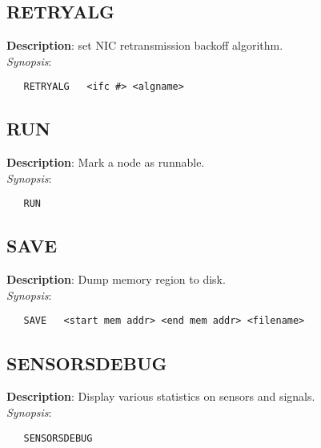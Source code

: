 \subsection{\bf RETRYALG}
\label{manpages:RETRYALG}
\label{manpages:retryalg}
\vspace{-0.2in}
{\bf Description}: 	set NIC retransmission backoff algorithm.\\[1.5ex]
{\em Synopsis}:
\vspace{-0.2in}
\scriptsize
\begin{verbatim}
   RETRYALG   <ifc #> <algname>		
\end{verbatim}
\normalsize
\vspace{-0.2in}


\subsection{\bf RUN}
\label{manpages:RUN}
\label{manpages:run}
\vspace{-0.2in}
{\bf Description}: 	Mark a node as runnable.\\[1.5ex]
{\em Synopsis}:
\vspace{-0.2in}
\scriptsize
\begin{verbatim}
   RUN    						
\end{verbatim}
\normalsize
\vspace{-0.2in}


\subsection{\bf SAVE}
\label{manpages:SAVE}
\label{manpages:save}
\vspace{-0.2in}
{\bf Description}: 	Dump memory region to disk.\\[1.5ex]
{\em Synopsis}:
\vspace{-0.2in}
\scriptsize
\begin{verbatim}
   SAVE   <start mem addr> <end mem addr> <filename>	
\end{verbatim}
\normalsize
\vspace{-0.2in}


\subsection{\bf SENSORSDEBUG}
\label{manpages:SENSORSDEBUG}
\label{manpages:sensorsdebug}
\vspace{-0.2in}
{\bf Description}: 	Display various statistics on sensors and signals.\\[1.5ex]
{\em Synopsis}:
\vspace{-0.2in}
\scriptsize
\begin{verbatim}
   SENSORSDEBUG    		
\end{verbatim}
\normalsize
\vspace{-0.2in}


